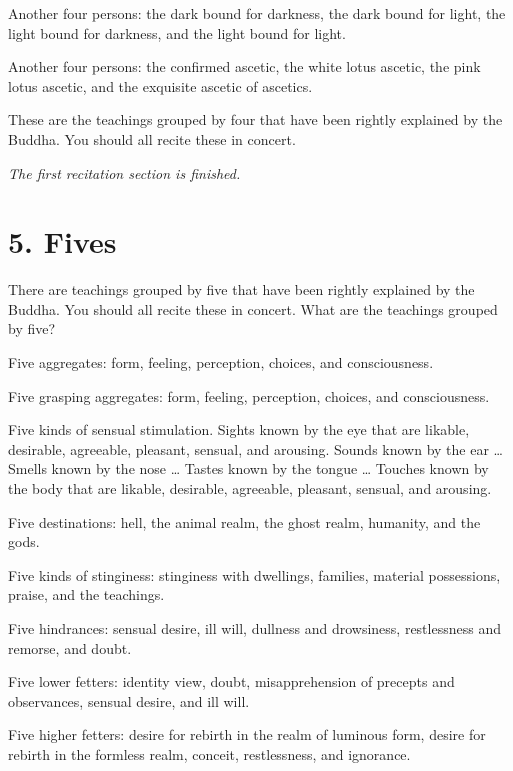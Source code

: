 \documentclass[12pt,openany]{book}%
\newcommand*{\scendsection}[1]{\begin{center}\textit{#1}\end{center}}
\begin{document}
Another four persons: the dark bound for darkness, the dark bound for light, the light bound for darkness, and the light bound for light. 

Another four persons: the confirmed ascetic, the white lotus ascetic, the pink lotus ascetic, and the exquisite ascetic of ascetics. 

These are the teachings grouped by four that have been rightly explained by the Buddha. You should all recite these in concert. 

\scendsection{The first recitation section is finished. }

\section*{5. Fives }

There are teachings grouped by five that have been rightly explained by the Buddha. You should all recite these in concert. What are the teachings grouped by five? 

Five aggregates: form, feeling, perception, choices, and consciousness. 

Five grasping aggregates: form, feeling, perception, choices, and consciousness. 

Five kinds of sensual stimulation. Sights known by the eye that are likable, desirable, agreeable, pleasant, sensual, and arousing. Sounds known by the ear … Smells known by the nose … Tastes known by the tongue … Touches known by the body that are likable, desirable, agreeable, pleasant, sensual, and arousing. 

Five destinations: hell, the animal realm, the ghost realm, humanity, and the gods. 

Five kinds of stinginess: stinginess with dwellings, families, material possessions, praise, and the teachings. 

Five hindrances: sensual desire, ill will, dullness and drowsiness, restlessness and remorse, and doubt. 

Five lower fetters: identity view, doubt, misapprehension of precepts and observances, sensual desire, and ill will. 

Five higher fetters: desire for rebirth in the realm of luminous form, desire for rebirth in the formless realm, conceit, restlessness, and ignorance. 
\end{document}
